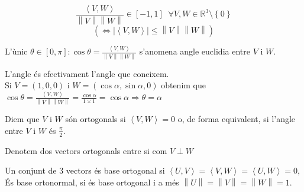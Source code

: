 \documentclass[../main.tex]{subfiles}
\begin{document}
\begin{displaymath}
    \frac{\left\langle V, W\right\rangle}{\left\lVert V\right\rVert\left\lVert W\right\rVert } \in \left[-1, 1\right]\;\;\forall V, W \in \mathbb{R}^3\setminus\left\{0\right\}
\end{displaymath}
\begin{displaymath}
    \left(\iff \left\lvert \left\langle V, W\right\rangle \right\rvert\leq\left\lVert V\right\rVert\left\lVert W\right\rVert\right)
\end{displaymath}
\begin{definicio}
    L'ùnic $\theta \in \left[0, \pi\right] : \cos{\theta} = \frac{\left\langle V, W\right\rangle}{\left\lVert V\right\rVert\left\lVert W\right\rVert }$
    s'anomena angle euclidia entre $V\text{ i }W$.
\end{definicio}
L'angle és efectivament l'angle que coneixem.\\
Si $V = (1,0,0)\text{ i }W = (\cos{\alpha}, \sin{\alpha}, 0)$ obtenim que $\cos{\theta} = \frac{\left\langle V, W\right\rangle}{\left\lVert V\right\rVert\left\lVert W\right\rVert } = \frac{\cos{\alpha}}{1\times1} = \cos{\alpha} \Rightarrow \theta = \alpha$
\begin{definicio}
    Diem que $V\text{ i }W$ són ortogonals si $\left\langle V, W\right\rangle = 0$ o, de forma
    equivalent, si l'angle entre $V\text{ i }W$ és $\frac{\pi}{2}$.\\
    \begin{notacio}
        Denotem dos vectors ortogonals entre si com $V\perp W$
    \end{notacio}
    Un conjunt de 3 vectors és base ortogonal si $\left\langle U, V\right\rangle = \left\langle V, W\right\rangle = \left\langle U, W\right\rangle = 0$,
    És base ortonormal, si és base ortogonal i a més $\left\lVert U\right\rVert = \left\lVert V\right\rVert = \left\lVert W\right\rVert = 1$.
\end{definicio}
\end{document}
